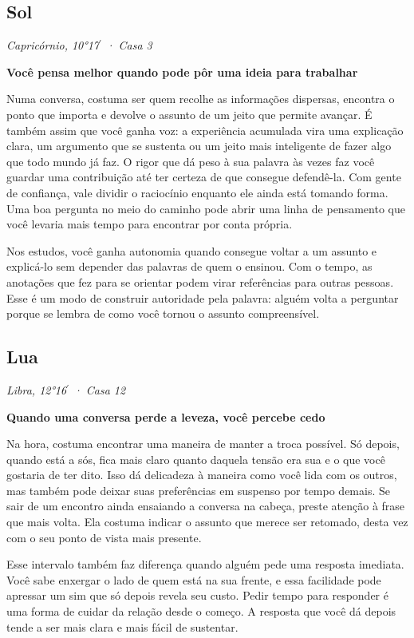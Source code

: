 \documentclass[11pt,a4paper]{article}
\newcommand{\leitura}[3]{\subsection{#1}\textit{#2}\par #3}
\newcommand{\subtituloleitura}[1]{\textbf{#1}\par\nopagebreak[4]}
\begin{document}
\leitura{Sol}{Capricórnio, 10°17\ensuremath{^{\prime}} · Casa 3}{
\subtituloleitura{Você pensa melhor quando pode pôr uma ideia para trabalhar} Numa conversa, costuma ser quem recolhe as informações dispersas, encontra o ponto que importa e devolve o assunto de um jeito que permite avançar. É também assim que você ganha voz: a experiência acumulada vira uma explicação clara, um argumento que se sustenta ou um jeito mais inteligente de fazer algo que todo mundo já faz. O rigor que dá peso à sua palavra às vezes faz você guardar uma contribuição até ter certeza de que consegue defendê-la. Com gente de confiança, vale dividir o raciocínio enquanto ele ainda está tomando forma. Uma boa pergunta no meio do caminho pode abrir uma linha de pensamento que você levaria mais tempo para encontrar por conta própria.

Nos estudos, você ganha autonomia quando consegue voltar a um assunto e explicá-lo sem depender das palavras de quem o ensinou. Com o tempo, as anotações que fez para se orientar podem virar referências para outras pessoas. Esse é um modo de construir autoridade pela palavra: alguém volta a perguntar porque se lembra de como você tornou o assunto compreensível.
}

\leitura{Lua}{Libra, 12°16\ensuremath{^{\prime}} · Casa 12}{
\subtituloleitura{Quando uma conversa perde a leveza, você percebe cedo} Na hora, costuma encontrar uma maneira de manter a troca possível. Só depois, quando está a sós, fica mais claro quanto daquela tensão era sua e o que você gostaria de ter dito. Isso dá delicadeza à maneira como você lida com os outros, mas também pode deixar suas preferências em suspenso por tempo demais. Se sair de um encontro ainda ensaiando a conversa na cabeça, preste atenção à frase que mais volta. Ela costuma indicar o assunto que merece ser retomado, desta vez com o seu ponto de vista mais presente.

Esse intervalo também faz diferença quando alguém pede uma resposta imediata. Você sabe enxergar o lado de quem está na sua frente, e essa facilidade pode apressar um sim que só depois revela seu custo. Pedir tempo para responder é uma forma de cuidar da relação desde o começo. A resposta que você dá depois tende a ser mais clara e mais fácil de sustentar.
}
\end{document}
